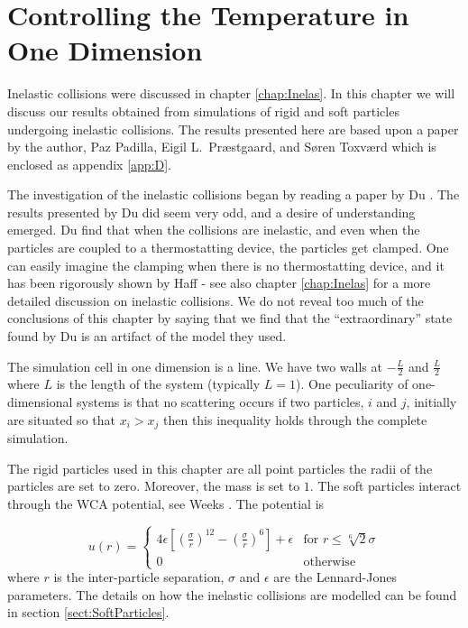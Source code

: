 
\chapter{Controlling the Temperature in One Dimension}
\label{chap:thermostat}

Inelastic collisions were discussed in chapter \ref{chap:Inelas}. In
this chapter we will discuss our results obtained from simulations of
rigid and soft particles undergoing inelastic collisions. The results
presented here are based upon a paper by the author, Paz Padilla,
Eigil L.\ Pr{\ae}stgaard, and S{\o}ren Toxv{\ae}rd \cite{Geisshirt97b}
which is enclosed as appendix \ref{app:D}.

The investigation of the inelastic collisions began by reading a paper
by Du \etal \cite{Du95}. The results presented by Du \etal did seem
very odd, and a desire of understanding emerged. Du \etal find that
when the collisions are inelastic, and even when the particles are
coupled to a thermostatting device, the particles get clamped. One can
easily imagine the clamping when there is no thermostatting device,
and it has been rigorously shown by Haff \cite{Haff83} - see also
chapter \ref{chap:Inelas} for a more detailed discussion on inelastic
collisions. We do not reveal too much of the conclusions of this
chapter by saying that we find that the ``extraordinary'' state found
by Du \etal is an artifact of the model they used.

The simulation cell in one dimension is a line. We have two walls at
$-\frac{L}{2}$ and $\frac{L}{2}$ where $L$ is the length  of the system
(typically $L=1$). One peculiarity of one-dimensional systems is that
no scattering occurs \ie if two particles, $i$ and $j$, initially are
situated so that $x_i > x_j$ then this inequality holds through the
complete simulation.

The rigid particles used in this chapter are all point particles
\ie the radii of the particles are set to zero. Moreover, the mass is
set to $1$. The soft particles interact through the WCA potential, see
Weeks \etal \cite{Weeks71}. The potential is

\begin{equation}
  u(r) = \begin{cases}
    4\epsilon \left[\left(\frac{\sigma}{r}\right)^{12}
      -\left(\frac{\sigma}{r}\right)^{6}\right] + \epsilon 
    & \text{for $r \le \sqrt[6]{2}\sigma$} \\
    0      & \text{otherwise}
  \end{cases}
\end{equation}
where $r$ is the inter-particle separation, $\sigma$ and $\epsilon$
are the Lennard-Jones parameters. The details on how the inelastic
collisions are modelled can be found in section \ref{sect:SoftParticles}.


